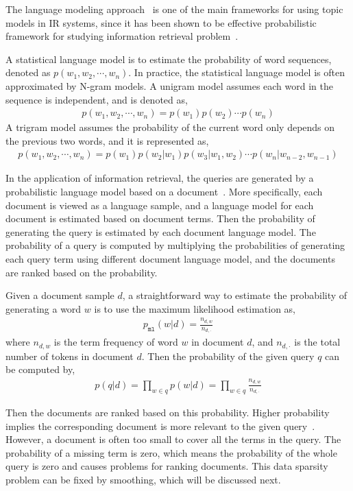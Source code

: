 The language modeling approach~\citep{croft-03,PonteCroft,song-99} is one of the main frameworks for using topic models in IR systems, since it has been shown to be effective probabilistic framework for studying information retrieval problem~\citep{PonteCroft,berger-99}.

A statistical language model is to estimate the probability of word sequences, denoted as $p(w_1,w_2,\cdots,w_n)$. In practice, the statistical language model is often approximated by N-gram models. A unigram model assumes each word in the sequence is independent, and is denoted as,
\begin{align}
p(w_1,w_2,\cdots,w_n) = p(w_1)p(w_2) \cdots p(w_n)
\end{align}
A trigram model assumes the probability of the current word only depends on the previous two words, and it is represented as,
\begin{align}
p(w_1,w_2,\cdots,w_n)=p(w_1)p(w_2|w_1)p(w_3|w_1,w_2)\cdots p(w_n|w_{n-2},w_{n-1})
\end{align}


In the application of information retrieval, the queries are generated by a probabilistic language model based on a document~\citep{zhai-01}. More specifically, each document is viewed as a language sample, and a language model for each document is estimated based on document terms. Then the probability of generating the query is estimated by each document language model. The probability of a query is computed by multiplying the probabilities of generating each query term using different document language model, and the documents are ranked based on the probability.

Given a document sample $d$, a straightforward way to estimate the probability of generating a word $w$ is to use the maximum likelihood estimation as,
\begin{align}
p_{\texttt{ml}}(w|d) = \frac{n_{d,w}}{n_{d,\cdot}}
\label{eq:ir_mse}
\end{align}
where $n_{d,w}$ is the term frequency of word $w$ in document $d$, and $n_{d,\cdot}$ is the total number of tokens in document $d$. Then the probability of the given query $q$ can be computed by,
\begin{align}
p(q|d) = \prod_{w \in q} p(w|d) = \prod_{w \in q} \frac{n_{d,w}}{n_{d,\cdot}}
\end{align}

Then the documents are ranked based on this probability. Higher probability implies the corresponding document is more relevant to the given query~\citep{song-99}. However, a document is often too small to cover all the terms in the query. The probability of a missing term is zero, which means the probability of the whole query is zero and causes problems for ranking documents. This data sparsity problem can be fixed by smoothing, which will be discussed next.

